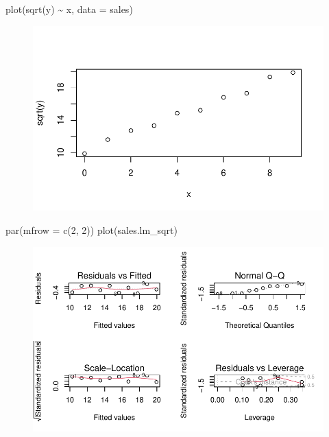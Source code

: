 \documentclass[
  letterpaper,
  DIV=11,
  numbers=noendperiod]{scrartcl}
\newenvironment{Shaded}{\begin{snugshade}}{\end{snugshade}}
\newcommand{\AttributeTok}[1]{\textcolor[rgb]{0.40,0.45,0.13}{#1}}
\newcommand{\DecValTok}[1]{\textcolor[rgb]{0.68,0.00,0.00}{#1}}
\newcommand{\FunctionTok}[1]{\textcolor[rgb]{0.28,0.35,0.67}{#1}}
\newcommand{\NormalTok}[1]{\textcolor[rgb]{0.00,0.23,0.31}{#1}}
\newcommand{\SpecialCharTok}[1]{\textcolor[rgb]{0.37,0.37,0.37}{#1}}
\begin{document}
\begin{Shaded}
\begin{Highlighting}[]
\FunctionTok{plot}\NormalTok{(}\FunctionTok{sqrt}\NormalTok{(y) }\SpecialCharTok{\textasciitilde{}}\NormalTok{ x, }\AttributeTok{data =}\NormalTok{ sales)}
\end{Highlighting}
\end{Shaded}

\begin{figure}[H]

{\centering \includegraphics{sta9700_ch3_hw_files/figure-pdf/unnamed-chunk-26-1.pdf}

}

\end{figure}

\begin{Shaded}
\begin{Highlighting}[]
\FunctionTok{par}\NormalTok{(}\AttributeTok{mfrow =} \FunctionTok{c}\NormalTok{(}\DecValTok{2}\NormalTok{, }\DecValTok{2}\NormalTok{))}
\FunctionTok{plot}\NormalTok{(sales.lm\_sqrt)}
\end{Highlighting}
\end{Shaded}

\begin{figure}[H]

{\centering \includegraphics{sta9700_ch3_hw_files/figure-pdf/unnamed-chunk-27-1.pdf}

}

\end{figure}
\end{document}
